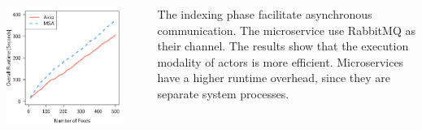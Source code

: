 \documentclass[final,hyperref={pdfpagelabels=true}]{beamer}
\begin{document}
\begin{frame}
\begin{columns}[t]
\begin{column}{.45\textwidth}
      \begin{columns}[t]
        \begin{column}{.4\textwidth}
          \includegraphics[width=1\textwidth]{graphics/eval-index-overall.pdf}
        \end{column}
        \begin{column}{.05\textwidth}
        \end{column}
        \begin{column}{.55\textwidth}
          {\lmodern
            The indexing phase facilitate asynchronous communication. The microservice use RabbitMQ as their channel. The results show that the execution modality of actors is more efficient. Microservices have a higher runtime overhead, since they are separate system processes. 
          }
        \end{column}
      \end{columns}


\end{column}
\end{columns}
\end{frame}
\end{document}
